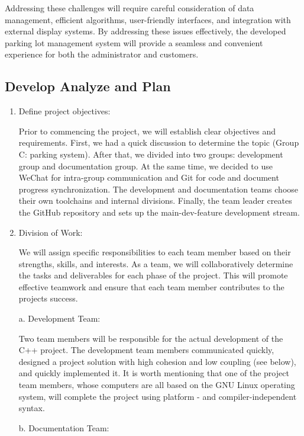 {{{			Addressing these challenges will require careful consideration of data management, efficient algorithms, user-friendly interfaces, and integration with external display systems. By addressing these issues effectively, the developed parking lot management system will provide a seamless and convenient
			experience for both the administrator and customers.
		}
		\subsection{Develop Analyze and Plan}\label{develop-analyze-and-plan}
		
			\begin{enumerate}
			\def\labelenumi{\arabic{enumi}.}
			\item
			Define project objectives:
			
			Prior to commencing the project, we will establish clear objectives
			and requirements. First, we had a quick discussion to determine the
			topic (Group C: parking system). After that, we divided into two
			groups: development group and documentation group. At the same time,
			we decided to use WeChat for intra-group communication and Git for
			code and document progress synchronization. The development and
			documentation teams choose their own toolchains and internal
			divisions. Finally, the team leader creates the GitHub repository and
			sets up the main-dev-feature development stream.
			\item
			Division of Work:
			
			We will assign specific responsibilities to each team member based on
			their strengths, skills, and interests. As a team, we will
			collaboratively determine the tasks and deliverables for each phase of
			the project. This will promote effective teamwork and ensure that each
			team member contributes to the project\textquotesingle s success.
			
			a. Development Team:
			
			Two team members will be responsible for the actual development of the
			C++ project. The development team members communicated quickly,
			designed a project solution with high cohesion and low coupling (see
			below), and quickly implemented it. It is worth mentioning that one of
			the project team members, whose computers are all based on the GNU
			Linux operating system, will complete the project using platform - and
			compiler-independent syntax.
			
			b. Documentation Team:
			

\end{enumerate}}}
